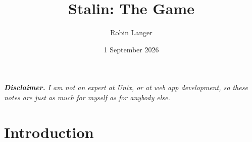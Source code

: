\documentclass[11pt,a4paper]{article}
\title{\vspace{-2em}Stalin: The Game}
\author{Robin Langer}
\date{1 September 2026}
\begin{document}
\maketitle

\begin{center}
\begin{minipage}{0.88\linewidth}\small\itshape
\textbf{Disclaimer.} I am not an expert at Unix, or at web app development, so these notes are
just as much for myself as for anybody else.
\end{minipage}
\end{center}
\vspace{1mm}

\section*{Introduction}
\end{document}

